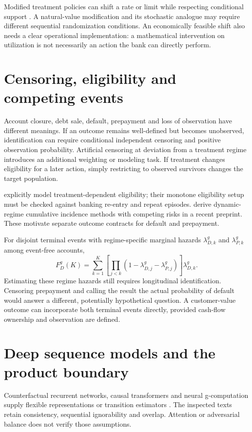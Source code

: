 Modified treatment policies can shift a rate or limit while respecting
conditional support \citep{lmtp2023}. A natural-value modification and
its stochastic analogue may require different sequential randomization
conditions. An economically feasible shift also needs a clear operational
implementation: a mathematical intervention on utilization is not necessarily
an action the bank can directly perform.

\section{Censoring, eligibility and competing events}
Account closure, debt sale, default, prepayment and loss of observation have
different meanings. If an outcome remains well-defined but becomes
unobserved, identification can require conditional independent censoring
and positive observation probability. Artificial censoring at deviation
from a treatment regime introduces an additional weighting or modeling task.
If treatment changes eligibility for a later action, simply restricting to
observed survivors changes the target population.

\citet{selective2025} explicitly model treatment-dependent eligibility;
their monotone eligibility setup must be checked against banking re-entry
and repeat episodes. \citet{competing2026} derive dynamic-regime cumulative
incidence methods with competing risks in a recent preprint. These motivate
separate outcome contracts for default and prepayment.

For disjoint terminal events with regime-specific marginal hazards
$\lambda^g_{D,k}$ and $\lambda^g_{P,k}$ among event-free accounts,
\begin{equation}
 F_D^g(K)=\sum_{k=1}^K
  \left[\prod_{j<k}(1-\lambda^g_{D,j}-\lambda^g_{P,j})\right]
  \lambda^g_{D,k}.
 \label{eq:cif}
\end{equation}
Estimating these regime hazards still requires longitudinal identification.
Censoring prepayment and calling the result the actual probability of default
would answer a different, potentially hypothetical question. A customer-value
outcome can incorporate both terminal events directly, provided cash-flow
ownership and observation are defined.

\section{Deep sequence models and the product boundary}
Counterfactual recurrent networks, causal transformers and neural
g-computation supply flexible representations or transition estimators
\citep{bica2020,melnychuk2022,gnet2020}. The inspected texts retain
consistency, sequential ignorability and overlap. Attention or adversarial
balance does not verify those assumptions.

